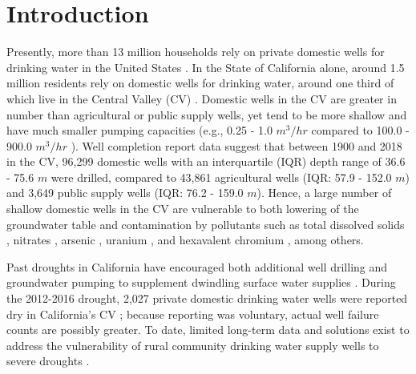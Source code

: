 


\section{Introduction}

Presently, more than 13 million households rely on private domestic wells for drinking water in the United States \citep{uscensus2017}. In the State of California alone, around 1.5 million residents rely on domestic wells for drinking water, around one third of which live in the Central Valley (CV) \citep{Dieter2018}. Domestic wells in the CV are greater in number than agricultural or public supply wells, yet tend to be more shallow and have much smaller pumping capacities (e.g., 0.25 - 1.0 $m^3/hr$ compared to 100.0 - 900.0 $m^3/hr$ \citep{Harter2003}). Well completion report data \citep{oswcr} suggest that between 1900 and 2018 in the CV, 96,299 domestic wells with an interquartile (IQR) depth range of 36.6 - 75.6 $m$ were drilled, compared to 43,861 agricultural wells (IQR: 57.9 - 152.0 $m$) and 3,649 public supply wells (IQR: 76.2 - 159.0 $m$). Hence, a large number of shallow domestic wells in the CV are vulnerable to both lowering of the groundwater table \citep{theis1935relation, theis1940source, sophocleous2000safe, Greene2018, Perrone2019} and contamination by pollutants such as total dissolved solids \citep{Cismowski2006, Bertoldi1991}, nitrates \citep{Harter2012, Balazs2011, Ransom2017}, arsenic \citep{Welch2000, Ahuja2008}, uranium \citep{Jurgens2008, Fujii1995}, and hexavalent chromium \citep{Robertson1991, Ellis2002}, among others. 

Past droughts in California have encouraged both additional well drilling and groundwater pumping to supplement dwindling surface water supplies \citep{Hanak2011, Medellin-azuara2016}. During the 2012-2016 drought, 2,027 private domestic drinking water wells were reported dry in California's CV \citep{observedDW}; because reporting was voluntary, actual well failure counts are possibly greater. To date, limited long-term data and solutions exist to address the vulnerability of rural community drinking water supply wells to severe droughts \citep{Mitchell2017, Feinstein2017}. 

